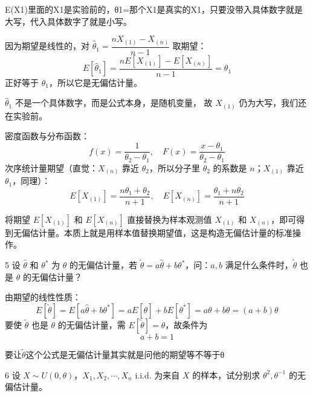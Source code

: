 \begin{dxtips}
    E(X1)里面的X1是实验前的，θ1=那个X1是真实的X1，只要没带入具体数字就是大写，代入具体数字了就是小写。
    
\end{dxtips}
\begin{note}
    因为期望是线性的，对 $\hat{\theta}_1 = \dfrac{nX_{(1)}-X_{(n)}}{n-1}$ 取期望：
$$E[\hat{\theta}_1] = \frac{nE[X_{(1)}]-E[X_{(n)}]}{n-1} = \theta_1$$
正好等于 $\theta_1$，所以它是无偏估计量。

$\hat{\theta}_1$ 不是一个具体数字，而是公式本身，是随机变量，
故 $X_{(1)}$ 仍为大写，我们还在实验前。
\end{note}
\begin{dxtips}[均匀分布必记]
    密度函数与分布函数：
    \[
    f(x) = \frac{1}{\theta_2-\theta_1}, \quad F(x) = \frac{x-\theta_1}{\theta_2-\theta_1}
    \]
    次序统计量期望（直觉：$X_{(n)}$ 靠近 $\theta_2$，所以分子里 $\theta_2$ 的系数是 $n$；$X_{(1)}$ 靠近 $\theta_1$，同理）：
    \[
    E[X_{(1)}] = \frac{n\theta_1+\theta_2}{n+1}, \quad E[X_{(n)}] = \frac{\theta_1+n\theta_2}{n+1}
    \]
\end{dxtips}
\begin{note}
将期望 $E[X_{(1)}]$ 和 $E[X_{(n)}]$ 直接替换为样本观测值 $X_{(1)}$ 和 $X_{(n)}$，即可得到无偏估计量。本质上就是用样本值替换期望值，这是构造无偏估计量的标准操作。
\end{note}
\begin{homework}{5}
设 $\hat{\theta}$ 和 $\theta^*$ 为 $\theta$ 的无偏估计量，若 $\tilde{\theta} = a\hat{\theta} + b\theta^*$，问：$a, b$ 满足什么条件时，$\tilde{\theta}$ 也是 $\theta$ 的无偏估计量？
\end{homework}
\begin{solution}
由期望的线性性质：
\[
E[\tilde{\theta}] = E[a\hat{\theta} + b\theta^*] = aE[\hat{\theta}] + bE[\theta^*] = a\theta + b\theta = (a+b)\theta
\]
要使 $\tilde{\theta}$ 也是 $\theta$ 的无偏估计量，需 $E[\tilde{\theta}] = \theta$，故条件为
\[
a + b = 1
\]
\end{solution}
\begin{dxtips}
    要让$\tilde{\theta}$这个公式是无偏估计量其实就是问他的期望等不等于θ
\end{dxtips}
\begin{homework}{6}
设 $X \sim U(0,\theta)$，$X_1, X_2, \cdots, X_n$ i.i.d. 为来自 $X$ 的样本，试分别求 $\theta^2, \theta^{-1}$ 的无偏估计量。
\end{homework}

